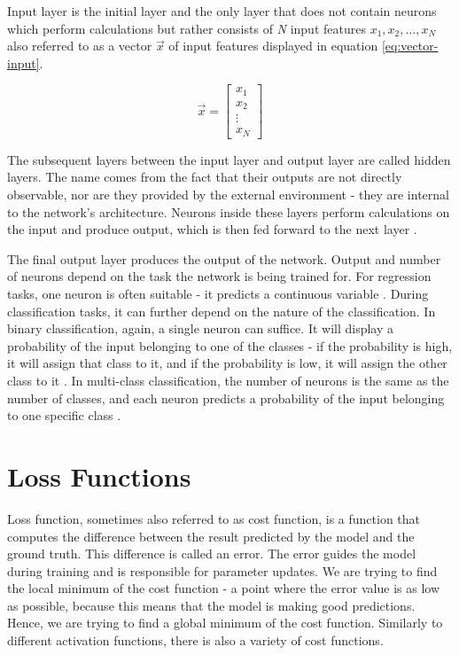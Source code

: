 Input layer is the initial layer and the only layer that does not contain neurons which perform calculations but rather consists of \textit{N} input features $x_1, x_2, \dots, x_N$ also referred to as a vector $\vec{x}$ of input features displayed in equation \ref{eq:vector-input}.

\begin{equation}
\label{eq:vector-input}
\vec{x} = \begin{bmatrix}
x_1 \\
x_2 \\
\vdots \\
x_N
\end{bmatrix}
\end{equation}

The subsequent layers between the input layer and output layer are called hidden layers. The name comes from the fact that their outputs are not directly observable, nor are they provided by the external environment - they are internal to the network's architecture. Neurons inside these layers perform calculations on the input and produce output, which is then fed forward to the next layer \cite{LeCun2015}.

The final output layer produces the output of the network. Output and number of neurons depend on the task the network is being trained for. For regression tasks, one neuron is often suitable - it predicts a continuous variable \cite{Goodfellow2016}. During classification tasks, it can further depend on the nature of the classification. In binary classification, again, a single neuron can suffice. It will display a probability of the input belonging to one of the classes - if the probability is high, it will assign that class to it, and if the probability is low, it will assign the other class to it \cite{Goodfellow2016}. In multi-class classification, the number of neurons is the same as the number of classes, and each neuron predicts a probability of the input belonging to one specific class \cite{Goodfellow2016}.

\section{Loss Functions}
Loss function, sometimes also referred to as cost function, is a function that computes the difference between the result predicted by the model and the ground truth. This difference is called an error. The error guides the model during training and is responsible for parameter updates. We are trying to find the local minimum of the cost function - a point where the error value is as low as possible, because this means that the model is making good predictions. Hence, we are trying to find a global minimum of the cost function. Similarly to different activation functions, there is also a variety of cost functions.

